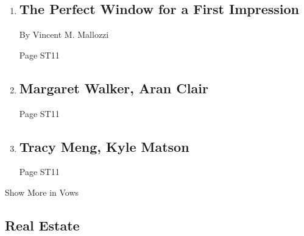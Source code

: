 \begin{enumerate}
\def\labelenumi{\arabic{enumi}.}
\item
  \href{/2020/03/27/style/the-perfect-window-for-a-first-impression.html}{}

  \hypertarget{the-perfect-window-for-a-first-impression}{%
  \subsection{The Perfect Window for a First
  Impression}\label{the-perfect-window-for-a-first-impression}}

  By Vincent M. Mallozzi

  Page ST11
\item
  \href{/2020/03/29/fashion/weddings/margaret-walker-aran-clair.html}{}

  \hypertarget{margaret-walker-aran-clair}{%
  \subsection{Margaret Walker, Aran
  Clair}\label{margaret-walker-aran-clair}}

  Page ST11
\item
  \href{/2020/03/29/fashion/weddings/tracy-meng-kyle-matson.html}{}

  \hypertarget{tracy-meng-kyle-matson}{%
  \subsection{Tracy Meng, Kyle Matson}\label{tracy-meng-kyle-matson}}

  Page ST11
\end{enumerate}

Show More in Vows

\hypertarget{real-estate}{%
\subsection{Real Estate}\label{real-estate}}

